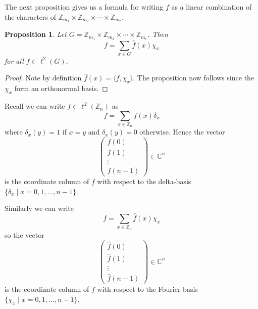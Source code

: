 \documentclass[12pt]{article}
\newtheorem{Proposition}{Proposition}
\newcommand{\Z}{\mathbb{Z}}
\newcommand{\C}{\mathbb{C}}
\newcommand{\Zm}{\Z_{m_1}\times \Z_{m_2} \times \cdots \times \Z_{m_r}}
\begin{document}
The next proposition gives us a formula for writing $f$ as a linear combination of the characters of $\Zm$.


\begin{Proposition} %
    Let $G = \Zm$.
    Then
    \[
        f = \sum_{x \in G} \widehat{f}(x)\chi_x
    \]
    for all $f\in \ell^2(G)$.
\end{Proposition}
\begin{proof}
    Note by definition $\widehat{f}(x) = \langle f, \chi_x \rangle $.
    The proposition now follows since the $\chi_x$ form an orthonormal basis.
\end{proof}

Recall we can write $f\in \ell^2(\Z_n)$ as
\[
    f = \sum_{x\in \Z_n} f(x)\delta_x
\]
where $\delta_x(y) = 1$ if $x = y$ and $\delta_x(y) = 0$ otherwise.
Hence the vector
\[
    \begin{pmatrix}
        f(0)   \\
        f(1)   \\
        \vdots \\
        f(n-1)
    \end{pmatrix}
    \in \C^n
\]
is the coordinate column of $f$ with respect to the delta-basis $\{\delta_x \mid x = 0, 1, \dots , n-1\}$.

Similarly we can write
\[
    f = \sum_{x\in \Z_n} \widehat{f}(x)\chi_x
\]
so  the vector
\[
    \begin{pmatrix}
        \widehat{f}(0)   \\
        \widehat{f}(1)   \\
        \vdots           \\
        \widehat{f}(n-1)
    \end{pmatrix}
    \in \C^n
\]
is the coordinate column of $f$ with respect to the Fourier basis $\{\chi_x \mid x = 0, 1, \dots , n-1\}$.
\end{document}
